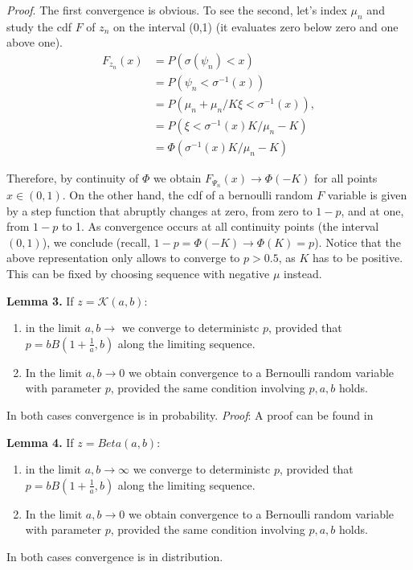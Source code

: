 \textit{Proof}. The first convergence is obvious. To see the second, let's index $\mu_n$ and  study the cdf $F$ of $z_n$ on the interval (0,1) (it evaluates zero below zero and one above one).
\begin{align}F_{z_n}(x)&= P(\sigma(\psi_n)<x) \\
&=P(\psi_n< \sigma^{-1}(x))\\
&=P(\mu_n +\mu_n/K\xi <\sigma^{-1}(x)),\\\
&= P( \xi <\sigma^{-1}(x)K/\mu_n - K)\\
&= \Phi( \sigma^{-1}(x)K/\mu_n - K) 
\end{align}

Therefore, by continuity of $\Phi$ we obtain $F_{\Psi_n}(x)\rightarrow \Phi(-K)$ for all points $x\in(0,1)$. On the other hand, the cdf of a bernoulli random $F$ variable is given by  a step function that abruptly changes at zero, from zero to $1-p$, and at one, from $1-p$ to 1. As convergence occurs at all continuity points (the interval $(0,1)$), we conclude (recall, $1-p= \Phi(-K)\rightarrow \Phi(K)=p$). Notice that the above representation only allows  to converge to $p>0.5$, as $K$ has to be positive. This can be fixed by choosing sequence with negative $\mu$ instead.

\textbf{Lemma 3.} If $z=\mathcal{K}(a,b)$: \begin{enumerate}
\item in the limit $a,b \rightarrow $  we converge to deterministc $p$, provided that $p=bB\left(1+\frac{1}{a},b\right)$ along the limiting sequence.
\item In the limit $a,b\rightarrow 0$ we obtain convergence to a Bernoulli random variable with parameter $p$, provided the same condition involving $p,a,b$ holds. 
\end{enumerate}
In both cases convergence is in probability.
\textit{Proof}: A proof can be found in \cite{mitnik2013kumar}

\textbf{Lemma 4.} If $z=Beta(a,b)$: \begin{enumerate}
\item in the limit $a,b \rightarrow \infty $  we converge to deterministc $p$, provided that $p=bB\left(1+\frac{1}{a},b\right)$ along the limiting sequence.
\item In the limit $a,b\rightarrow 0$ we obtain convergence to a Bernoulli random variable with parameter $p$, provided the same condition involving $p,a,b$ holds. 
\end{enumerate}
In both cases convergence is in distribution.

